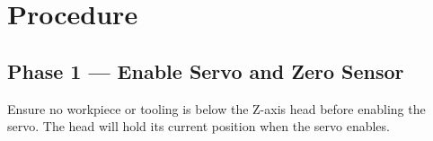 
\section{Procedure}
\label{sec:procedure}


\subsection{Phase 1 — Enable Servo and Zero Sensor}
\label{sec:proc:phase1}

\begin{warningbox}
  Ensure no workpiece or tooling is below the Z-axis head before enabling
  the servo.  The head will hold its current position when the servo
  enables.
\end{warningbox}

